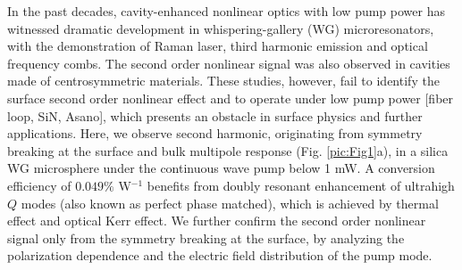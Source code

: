 \documentclass[a4paper,8pt,hyperref, twocolumn]{article}
\begin{document}
In the past decades, cavity-enhanced nonlinear optics with low pump power has witnessed dramatic development in whispering-gallery (WG) microresonators, with the demonstration of Raman laser, third harmonic emission and optical frequency combs. 
The second order nonlinear signal was also observed
in cavities made of centrosymmetric materials.
These studies, however, fail to identify the surface second order nonlinear effect and to operate under low pump power [fiber loop, SiN, Asano], which presents an obstacle in surface physics and further applications.
Here, we observe second harmonic, originating from symmetry breaking at the surface and bulk multipole response (Fig. \ref{pic:Fig1}a), in a silica WG microsphere under the continuous wave pump below 1 mW. 
% 
A conversion efficiency of $0.049\%$ W$^{-1}$ benefits from doubly resonant enhancement of ultrahigh $Q$ modes (also known as perfect phase matched), which is achieved by thermal effect and optical Kerr effect. 
We further confirm the second order nonlinear signal only from the symmetry breaking at the surface, by analyzing the polarization dependence and the electric field distribution of the pump mode. 
\end{document}
